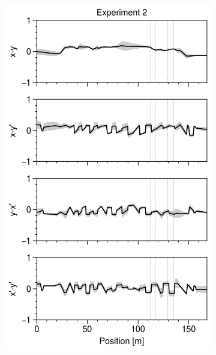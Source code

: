 \begin{figure}[!p]
\begin{subfigure}{0.32\textwidth}
        \includegraphics[width=\textwidth]{Images/chapter5/exp2/compare_corr.png}
    \end{subfigure}
    \hfill
    \begin{subfigure}{0.32\textwidth}

\end{subfigure}
\end{figure}
